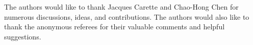 \documentclass[acmsmall]{acmart}
\begin{document}

\renewcommand{\appendixsectionformat}[2]{
  {Supplementary material for Section~#1}
}




 \begin{acks}
   The authors would like to thank Jacques Carette and Chao-Hong Chen for numerous discussions, ideas, and contributions.  The authors would also like to thank the anonymous referees for their valuable comments and helpful suggestions.
\end{acks}


\end{document}
